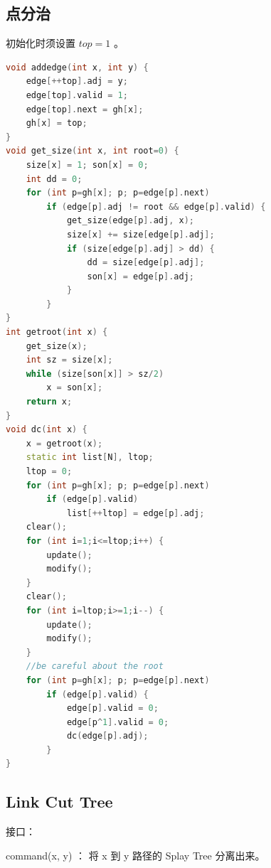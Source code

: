\documentclass{article}
\begin{document}
\subsection{点分治}
初始化时须设置 $top = 1$ 。
\begin{lstlisting}[language=C++]
void addedge(int x, int y) {
	edge[++top].adj = y;
	edge[top].valid = 1;
	edge[top].next = gh[x];
	gh[x] = top;
}
void get_size(int x, int root=0) {
	size[x] = 1; son[x] = 0;
	int dd = 0;
	for (int p=gh[x]; p; p=edge[p].next)
		if (edge[p].adj != root && edge[p].valid) {
			get_size(edge[p].adj, x);
			size[x] += size[edge[p].adj];
			if (size[edge[p].adj] > dd) {
				dd = size[edge[p].adj];
				son[x] = edge[p].adj;
			}
		}
}
int getroot(int x) {
	get_size(x);
	int sz = size[x];
	while (size[son[x]] > sz/2)
		x = son[x];
	return x;
}
void dc(int x) {
	x = getroot(x);
	static int list[N], ltop;
	ltop = 0;
	for (int p=gh[x]; p; p=edge[p].next)
		if (edge[p].valid)
			list[++ltop] = edge[p].adj;
	clear();
	for (int i=1;i<=ltop;i++) {
		update();
		modify();
	}
	clear();
	for (int i=ltop;i>=1;i--) {
		update();
		modify();
	}
	//be careful about the root
	for (int p=gh[x]; p; p=edge[p].next)
		if (edge[p].valid) {
			edge[p].valid = 0;
			edge[p^1].valid = 0;
			dc(edge[p].adj);
		}
}
\end{lstlisting}
\subsection{Link Cut Tree}
接口： 

command(x, y) ： 将 x 到 y 路径的 Splay Tree 分离出来。 
\end{document}
